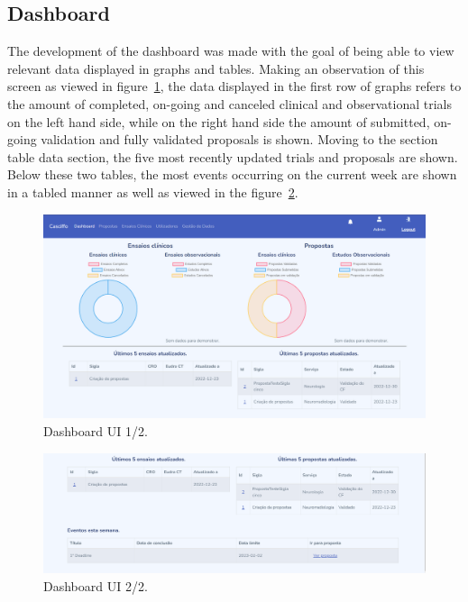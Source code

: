 \subsection{Dashboard}
The development of the dashboard was made with the goal of being able to view relevant data displayed in graphs and tables. Making an observation of this screen as viewed in figure~\ref{fig:dashboard-ui-1}, the data displayed in the first row of graphs refers to the amount of completed, on-going and canceled clinical and observational trials on the left hand side, while on the right hand side the amount of submitted, on-going validation and fully validated proposals is shown.
Moving to the section table data section, the five most recently updated trials and proposals are shown. Below these two tables, the most events occurring on the current week are shown in a tabled manner as well as viewed in the figure~\ref{fig:dashboard-ui-2}.


\begin{figure}[H]
    \centering
    \includegraphics[scale=0.4]{Chapters/img/ui/dashboard-1.png}
    \caption{Dashboard UI 1/2.}
    \label{fig:dashboard-ui-1}
\end{figure}

\begin{figure}[H]
    \centering
    \includegraphics[scale=0.4]{Chapters/img/ui/dashboard-2.png}
    \caption{Dashboard UI 2/2.}
    \label{fig:dashboard-ui-2}
\end{figure}


